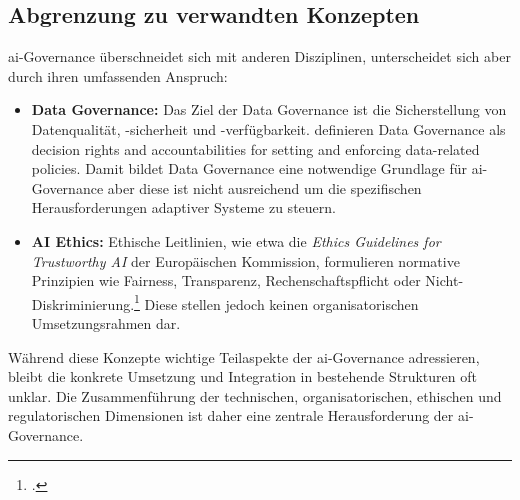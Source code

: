\subsection{Abgrenzung zu verwandten Konzepten}
\label{subsec:abgrenzung}
\ac{ai}-Governance überschneidet sich mit anderen Disziplinen, unterscheidet sich aber durch ihren umfassenden Anspruch:
\begin{itemize}
	\item \textbf{Data Governance:} Das Ziel der Data Governance ist die Sicherstellung von Datenqualität, -sicherheit und -verfügbarkeit. \cite[148-149]{khatriDesigningDataGovernance2010} definieren Data Governance als \glqq{}decision rights and accountabilities for setting and enforcing data-related policies\grqq{}. Damit bildet Data Governance eine notwendige Grundlage für \ac{ai}-Governance aber diese ist nicht ausreichend um die spezifischen Herausforderungen adaptiver Systeme zu steuern.
	\item \textbf{AI Ethics:} Ethische Leitlinien, wie etwa die \textit{Ethics Guidelines for Trustworthy AI} der Europäischen Kommission, formulieren normative Prinzipien wie Fairness, Transparenz, Rechenschaftspflicht oder Nicht-Diskriminierung.\footcite[14-17]{europeancomissionEthicsGuidelinesTrustworthy} Diese stellen jedoch keinen organisatorischen Umsetzungsrahmen dar.
\end{itemize}
Während diese Konzepte wichtige Teilaspekte der \ac{ai}-Governance adressieren, bleibt die konkrete Umsetzung und Integration in bestehende Strukturen oft unklar.
Die Zusammenführung der technischen, organisatorischen, ethischen und regulatorischen Dimensionen ist daher eine zentrale Herausforderung der \ac{ai}-Governance.

